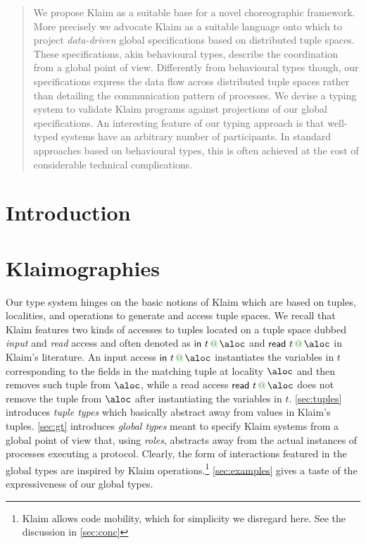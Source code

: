 \documentclass[runningheads,a4paper]{llncs}
\begin{document}
\begin{abstract}
  We propose Klaim as a suitable base for a novel choreographic
  framework.
  More precisely we advocate Klaim as a suitable language onto which
  to project \emph{data-driven} global specifications based on
  distributed tuple spaces.
  These specifications, akin behavioural types, describe the coordination
  from a global point of view.
  Differently from behavioural types though, our specifications
  express the data flow across distributed tuple spaces rather than
  detailing the communication pattern of processes.
  We devise a typing system to validate Klaim programs against projections
  of our global specifications.
  An interesting feature of our typing approach is that well-typed
  systems have an arbitrary number of participants.
  In standard approaches based on behavioural types, this is often
  achieved at the cost of considerable technical complications.
\end{abstract}



\section{Introduction}
\label{sec:intro}


\section{Klaimographies}
\label{sec:klaimographies}
Our type system hinges on the basic notions of Klaim which are based
on tuples, localities, and operations to generate and access tuple
spaces.
%
We recall that Klaim features two kinds of accesses to tuples located
on a tuple space dubbed \emph{input} and \emph{read} access and often
denoted as $\textsf{in}\ t \at \aloc$ and
$\textsf{read}\ t \at \aloc$ in Klaim's literature.
%
An input access $\textsf{in}\ t \at \aloc$ instantiates the
variables in $t$ corresponding to the fields in the matching
tuple at locality $\aloc$ and then removes such tuple from $\aloc$, while
a read access $\textsf{read}\ t \at \aloc$ does not remove the
tuple from $\aloc$ after instantiating the variables in $t$.
%
\cref{sec:tuples} introduces \emph{tuple types} which basically
abstract away from values in Klaim's tuples.
%
\cref{sec:gt} introduces \emph{global types} meant to specify
Klaim systems from a global point of view that, using \emph{roles},
abstracts away from the actual instances of processes executing a
protocol.
%
Clearly, the form of interactions featured in the global types are
inspired by Klaim operations.\footnote{Klaim allows code mobility, which for
  simplicity we disregard here. See the discussion in \cref{sec:conc}}
%
\cref{sec:examples} gives a taste of the expressiveness of our global
types.
\end{document}
